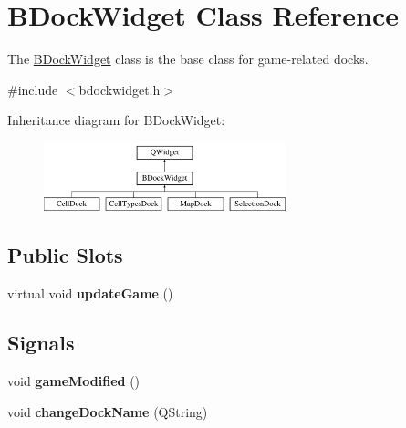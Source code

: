 \hypertarget{class_b_dock_widget}{\section{\-B\-Dock\-Widget \-Class \-Reference}
\label{class_b_dock_widget}
}


\-The \hyperlink{class_b_dock_widget}{\-B\-Dock\-Widget} class is the base class for game-\/related docks.  




{\ttfamily \#include $<$bdockwidget.\-h$>$}

\-Inheritance diagram for \-B\-Dock\-Widget\-:\begin{figure}[H]
\begin{center}
\leavevmode
\includegraphics[height=2.000000cm]{class_b_dock_widget}
\end{center}
\end{figure}
\subsection*{\-Public \-Slots}
\begin{DoxyCompactItemize}
\item 
\hypertarget{class_b_dock_widget_af5b0bf4f6ccb10d3a6dfb2793dc30fc0}{virtual void {\bfseries update\-Game} ()}\label{class_b_dock_widget_af5b0bf4f6ccb10d3a6dfb2793dc30fc0}

\end{DoxyCompactItemize}
\subsection*{\-Signals}
\begin{DoxyCompactItemize}
\item 
\hypertarget{class_b_dock_widget_aac0c798372f3400d56e974ccbf4b6a2d}{void {\bfseries game\-Modified} ()}\label{class_b_dock_widget_aac0c798372f3400d56e974ccbf4b6a2d}

\item 
\hypertarget{class_b_dock_widget_a52d21551cb5aaa800969953d83d5799a}{void {\bfseries change\-Dock\-Name} (\-Q\-String)}\label{class_b_dock_widget_a52d21551cb5aaa800969953d83d5799a}

\end{DoxyCompactItemize}
